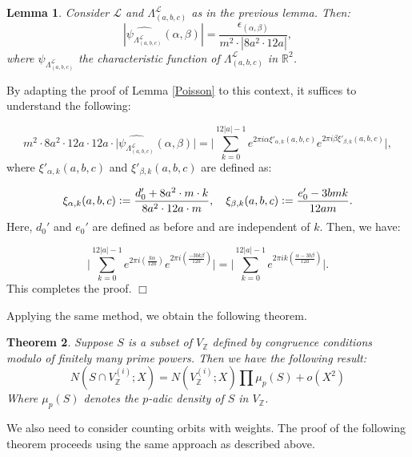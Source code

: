 \documentclass{article}
\def\Z{{\mathbb Z}}
\def\R{{\mathbb R}}
\def\Z{{\mathbb Z}}
\newtheorem{theorem}{Theorem}[section]
\newtheorem{lemma}[theorem]{Lemma}
\newenvironment{proof}{\noindent {\bf Proof:}}{$\Box$ \vspace{2 ex}}
\begin{document}
\begin{lemma}
Consider $\mathcal{L}$ and $\Lambda_{(a,b,c)}^{\mathcal{L}}$ as in the previous lemma. Then:
\begin{equation*}
|\widehat{\psi_{\Lambda_{(a,b,c)}^{\mathcal{L}}}}(\alpha,\beta)| = \frac{\epsilon_{(\alpha,\beta)}}{m^2 \cdot |8a^2 \cdot 12a|},
\end{equation*}
where $
\psi_{\Lambda_{(a,b,c)}^{\mathcal{L}}}$ the characteristic function of $\Lambda_{(a,b,c)}^{\mathcal{L}}$ in $\R^2$.
\end{lemma}
\begin{proof}
By adapting the proof of Lemma \ref{Poisson} to this context, it suffices to understand the following:

\begin{equation*}
    m^2 \cdot 8a^2 \cdot 12a \cdot 12a \cdot \big|\widehat{\psi_{\Lambda_{(a,b,c)}^{\mathcal{L}}}}(\alpha,\beta)\big| = \Big|\sum_{k=0}^{12|a|-1} e^{2\pi i \alpha \xi'_{\alpha,k}(a, b, c)} e^{2\pi i \beta \xi'_{\beta,k}(a, b, c)}\Big|,
\end{equation*}
where $\xi'_{\alpha,k}(a, b, c)$ and $\xi'_{\beta,k}(a, b, c)$ are defined as:

\begin{equation*}
    \xi_{\alpha,k}(a, b, c) \vcentcolon= \frac{d_0' + 8a^2 \cdot m \cdot k}{8a^2 \cdot 12a \cdot m}, \quad \xi_{\beta,k}(a, b, c) \vcentcolon= \frac{e_0' - 3bmk}{12am}.
\end{equation*}
Here, $d_0'$ and $e_0'$ are defined as before and are independent of $k$. Then, we have:

\begin{equation*}
    \Big|\sum_{k=0}^{12|a|-1} e^{2\pi i \left( \frac{k\alpha}{12a} \right)} e^{2\pi i \left( \frac{-3bk\beta}{12a} \right)}\Big| = \Big|\sum_{k=0}^{12|a|-1} e^{2\pi i k \left( \frac{\alpha - 3b\beta}{12a} \right)}\Big|.
\end{equation*}
This completes the proof.
\end{proof}

Applying the same method, we obtain the following theorem.

\begin{theorem}
Suppose $S$ is a subset of $V_{\mathbb{Z}}$ defined by congruence conditions modulo of finitely many prime powers. Then we have the following result:
\begin{equation*}
N(S \cap V_{\Z}^{(i)};X) = N(V_{\Z}^{(i)};X) \prod \mu_p(S) + o(X^2)
\end{equation*}
Where $\mu_p(S)$ denotes the $p$-adic density of $S$ in $V_{\Z}$.
\end{theorem}
We also need to consider counting orbits with weights. The proof of the following theorem proceeds using the same approach as described above.
\end{document}
